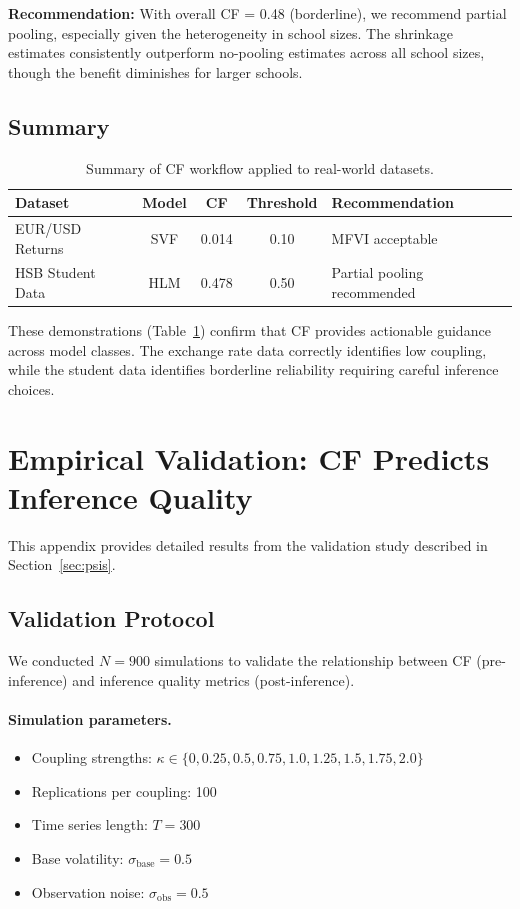 \documentclass[10pt]{article} %
\theoremstyle{plain}
\theoremstyle{definition}
\begin{document}
\textbf{Recommendation:} With overall CF = 0.48 (borderline), we recommend partial pooling, especially given the heterogeneity in school sizes. The shrinkage estimates consistently outperform no-pooling estimates across all school sizes, though the benefit diminishes for larger schools.

\subsection{Summary}

\begin{table}[!htbp]
\centering
\begin{tabular}{lcccl}
\toprule
Dataset & Model & CF & Threshold & Recommendation \\
\midrule
EUR/USD Returns & SVF & 0.014 & 0.10 & MFVI acceptable \\
HSB Student Data & HLM & 0.478 & 0.50 & Partial pooling recommended \\
\bottomrule
\end{tabular}
\caption{Summary of CF workflow applied to real-world datasets.}
\label{tab:realworld}
\end{table}

These demonstrations (Table~\ref{tab:realworld}) confirm that CF provides actionable guidance across model classes. The exchange rate data correctly identifies low coupling, while the student data identifies borderline reliability requiring careful inference choices.


\section{Empirical Validation: CF Predicts Inference Quality}
\label{app:psis}

This appendix provides detailed results from the validation study described in Section~\ref{sec:psis}.

\subsection{Validation Protocol}

We conducted $N = 900$ simulations to validate the relationship between CF (pre-inference) and inference quality metrics (post-inference).

\paragraph{Simulation parameters.}
\begin{itemize}[nosep]
    \item Coupling strengths: $\kappa \in \{0, 0.25, 0.5, 0.75, 1.0, 1.25, 1.5, 1.75, 2.0\}$
    \item Replications per coupling: 100
    \item Time series length: $T = 300$
    \item Base volatility: $\sigma_{\text{base}} = 0.5$
    \item Observation noise: $\sigma_{\text{obs}} = 0.5$
\end{itemize}
\end{document}
